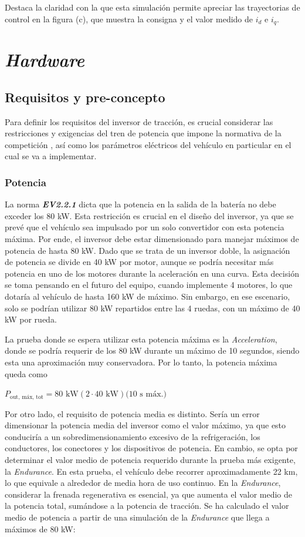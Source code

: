 Destaca la claridad con la que esta simulación permite apreciar las trayectorias de control en la figura (c), que muestra la consigna y el valor medido de $i_d$ e $i_q$.


\newpage
\section{\textit{Hardware}}

\subsection{Requisitos y pre-concepto}

Para definir los requisitos del inversor de tracción, es crucial considerar las restricciones y exigencias del tren de potencia que impone la normativa de la competición \cite{FSG}, así como los parámetros eléctricos del vehículo en particular en el cual se va a implementar.

\subsubsection{Potencia}
La norma \textit{\textbf{EV2.2.1}} \cite{FSG} dicta que la potencia en la salida de la batería no debe exceder los 80 kW. Esta restricción es crucial en el diseño del inversor, ya que se prevé que el vehículo sea impulsado por un solo convertidor con esta potencia máxima. Por ende, el inversor debe estar dimensionado para manejar máximos de potencia de hasta 80 kW. Dado que se trata de un inversor doble, la asignación de potencia se divide en 40 kW por motor, aunque se podría necesitar más potencia en uno de los motores durante la aceleración en una curva. Esta decisión se toma pensando en el futuro del equipo, cuando implemente 4 motores, lo que dotaría al vehículo de hasta 160 kW de máximo. Sin embargo, en ese escenario, solo se podrían utilizar 80 kW repartidos entre las 4 ruedas, con un máximo de 40 kW por rueda.

La prueba donde se espera utilizar esta potencia máxima es la \textit{Acceleration}, donde se podría requerir de los 80 kW durante un máximo de 10 segundos, siendo esta una aproximación muy conservadora. Por lo tanto, la potencia máxima queda como

\(P_{\text{out, máx, tot}} = 80 \text{ kW} (2 \cdot 40 \text{ kW}) \text{(10 s máx.)}\)


Por otro lado, el requisito de potencia media es distinto. Sería un error dimensionar la potencia media del inversor como el valor máximo, ya que esto conduciría a un sobredimensionamiento excesivo de la refrigeración, los conductores, los conectores y los dispositivos de potencia. En cambio, se opta por determinar el valor medio de potencia requerido durante la prueba más exigente, la \textit{Endurance}. En esta prueba, el vehículo debe recorrer aproximadamente 22 km, lo que equivale a alrededor de media hora de uso continuo. En la \textit{Endurance}, considerar la frenada regenerativa es esencial, ya que aumenta el valor medio de la potencia total, sumándose a la potencia de tracción. Se ha calculado el valor medio de potencia a partir de una simulación de la \textit{Endurance} que llega a máximos de 80 kW:


